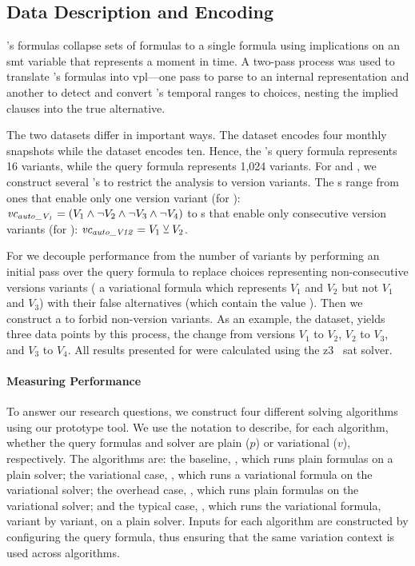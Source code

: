 \subsection{Data Description and Encoding}%
\label{section:exper-meth:description}
%
\nieke{}'s formulas collapse sets of \pl{} formulas to a single formula using
implications on an \ac{smt} variable that represents a moment in time. A
two-pass process was used to translate \nieke{}'s formulas into \ac{vpl}---one
pass to parse to an internal representation and another to detect and convert
\nieke{}'s temporal ranges to choices, nesting the implied clauses into the true
alternative.

The two datasets differ in important ways. The \auto{} dataset encodes four
monthly snapshots while the \fin{} dataset encodes ten. Hence, the \auto{}'s
query formula represents 16 variants, while the \fin{} query formula represents
1,024 variants. For  and , we construct several \vc{}'s to
restrict the analysis to version variants. The \vc{}s range from ones that
enable only one version variant (for ): $\mathit{vc_{\mathit{auto\_V_{1}}}} =
(V_{1} \wedge \neg V_{2} \wedge \neg V_{3} \wedge \neg V_{4})$ to \vc{}s that
enable only consecutive version variants (for ):
$\mathit{vc_{\mathit{auto\_V12}}} = V_{1} \veebar V_{2}$.

For  we decouple performance from the number of variants by performing
an initial pass over the query formula to replace choices representing
non-consecutive versions variants (\eg{} a variational formula which represents
$V_{1}$ and $V_{2}$ but not $V_{1}$ and $V_{3}$) with their false alternatives
(which contain the value \tru{}). Then we construct a \vc{} to forbid
non-version variants. As an example, the \auto{} dataset, yields three data
points by this process, the change from versions $V_{1}$ to $V_{2}$, $V_{2}$ to
$V_{3}$, and $V_{3}$ to $V_{4}$. All results presented for  were
  calculated using the z3~{\citep{10.1007/978-3-540-78800-3_24}} \ac{sat}
  solver.

\paragraph{Measuring Performance}%
\label{section:exper-meth:perf}
%
To answer our research questions, we construct four different solving
algorithms using our prototype tool. We use the notation
 to describe, for each algorithm, whether the query
formulas and solver are plain ($p$) or variational ($v$), respectively.
%
The algorithms are: the baseline, \pTop{}, which runs plain formulas on a plain
solver; the variational case, \vTov{}, which runs a variational formula on the
variational solver; the overhead case, \pTov{}, which runs plain formulas on the
variational solver; and the typical case, \vTop{}, which runs the variational
formula, variant by variant, on a plain solver. Inputs for each algorithm are
constructed by configuring the query formula, thus ensuring that the same
variation context is used across algorithms.

